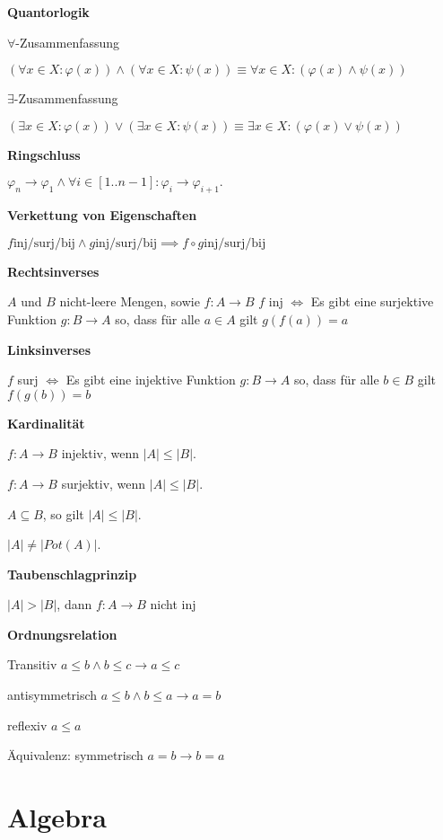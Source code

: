 \documentclass[a4paper,10pt]{article}
\begin{document}
\begin{multicols}{3}
\textbf{Quantorlogik}

$\forall$-Zusammenfassung

$(\forall x \in X: \varphi(x)) \wedge (\forall x \in X: \psi(x)) \equiv \forall x \in X: (\varphi(x) \wedge \psi(x))$

$\exists$-Zusammenfassung

$(\exists x \in X: \varphi(x)) \vee (\exists x \in X: \psi(x)) \equiv \exists x \in X: (\varphi(x) \vee \psi(x))$

\textbf{Ringschluss}

$ \varphi_{n} \rightarrow \varphi_1 \wedge \forall i \in [1..n-1]: \varphi_i \rightarrow \varphi_{i+1}. $

\textbf{Verkettung von Eigenschaften}

$f \text{inj/surj/bij} \land g \text{inj/surj/bij} \implies f\circ g\text{inj/surj/bij}$

\textbf{Rechtsinverses}

$A$ und $B$ nicht-leere Mengen, sowie $f\colon A \rightarrow B$
$f$ inj $\iff$ Es gibt eine surjektive Funktion $g\colon B \rightarrow A$ so, dass für alle $a \in A$ gilt $g(f(a))=a$

\textbf{Linksinverses}

$f$ surj $\iff$ Es gibt eine injektive Funktion $g\colon B \rightarrow A$ so, dass für alle $b \in B$ gilt $f(g(b))=b$

\textbf{Kardinalität}

$f\colon A \rightarrow B$ injektiv, wenn $|A| \leq |B|$.

$f\colon A \rightarrow B$ surjektiv, wenn $|A| \leq |B|$.

$A \subseteq B$, so gilt $|A| \leq |B|$.

$|A| \neq |Pot(A)|$.

\textbf{Taubenschlagprinzip}

$|A| > |B|$, dann $f: A \to B$ nicht inj

\textbf{Ordnungsrelation}

Transitiv $a \leq b \land b \leq c \rightarrow a \leq c$

antisymmetrisch $a \leq b \land b \leq a \rightarrow a=b$

reflexiv $a \leq a$

Äquivalenz: symmetrisch $a = b \rightarrow b = a$

\section{Algebra}


\end{multicols}
\end{document}
